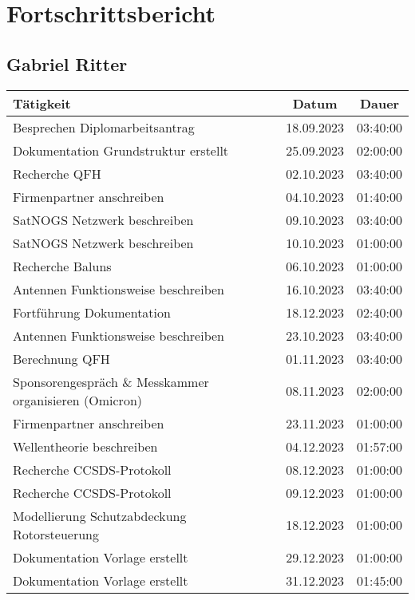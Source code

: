 \chapter{Fortschrittsbericht}

\section{Gabriel Ritter}

\begin{longtable}{|l|c|c|}
	\hline
	\textbf{Tätigkeit} & \textbf{Datum} & \textbf{Dauer} \\
	\hline
	Besprechen Diplomarbeitsantrag & 18.09.2023 & 03:40:00 \\
	\hline
	Dokumentation Grundstruktur erstellt & 25.09.2023 & 02:00:00 \\
	\hline
	Recherche QFH & 02.10.2023 & 03:40:00 \\
	\hline
	Firmenpartner anschreiben & 04.10.2023 & 01:40:00 \\
	\hline
	SatNOGS Netzwerk beschreiben & 09.10.2023 & 03:40:00 \\
	\hline
	SatNOGS Netzwerk beschreiben & 10.10.2023 & 01:00:00 \\
	\hline
	Recherche Baluns & 06.10.2023 & 01:00:00 \\
	\hline
	Antennen Funktionsweise beschreiben & 16.10.2023 & 03:40:00 \\
	\hline
	Fortführung Dokumentation & 18.12.2023 & 02:40:00 \\
	\hline
	Antennen Funktionsweise beschreiben & 23.10.2023 & 03:40:00 \\
	\hline
	Berechnung QFH & 01.11.2023 & 03:40:00 \\
	\hline
	Sponsorengespräch \& Messkammer organisieren (Omicron) & 08.11.2023 & 02:00:00 \\
	\hline
	Firmenpartner anschreiben & 23.11.2023 & 01:00:00 \\
	\hline
	Wellentheorie beschreiben & 04.12.2023 & 01:57:00 \\
	\hline
	Recherche CCSDS-Protokoll & 08.12.2023 & 01:00:00 \\
	\hline
	Recherche CCSDS-Protokoll & 09.12.2023 & 01:00:00 \\
	\hline
	Modellierung Schutzabdeckung Rotorsteuerung & 18.12.2023 & 01:00:00 \\
	\hline
	Dokumentation Vorlage erstellt & 29.12.2023 & 01:00:00 \\
	\hline
	Dokumentation Vorlage erstellt & 31.12.2023 & 01:45:00 \\

\end{longtable}
